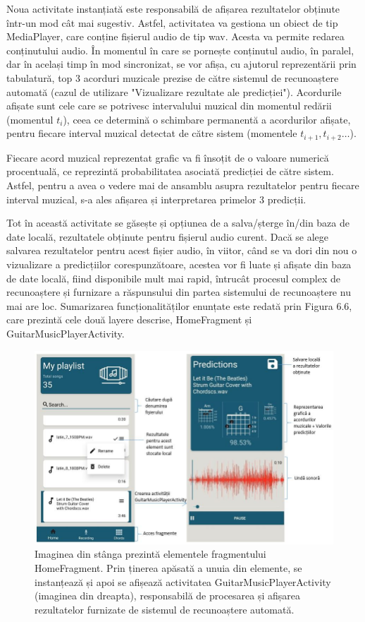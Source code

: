 \documentclass[a4paper,12pt]{report}
\begin{document}
Noua activitate instanțiată este responsabilă de
afișarea rezultatelor obținute într-un mod cât 
mai sugestiv. Astfel, activitatea va gestiona un 
obiect de tip MediaPlayer, care conține fișierul 
audio de tip wav. Acesta va permite redarea 
conținutului audio. În momentul în 
care se pornește conținutul audio, în paralel,
dar în același timp în mod sincronizat, se 
vor afișa, cu ajutorul reprezentării prin tabulatură, 
top 3 acorduri muzicale prezise de către sistemul 
de recunoaștere automată (cazul de utilizare 
"Vizualizare rezultate ale predicției"). 
Acordurile afișate sunt 
cele care se potrivesc intervalului muzical din momentul 
redării (momentul $t_i$), ceea ce determină o schimbare permanentă
a acordurilor afișate, pentru fiecare interval muzical detectat 
de către sistem (momentele $t_{i+1}, t_{i+2}\dots$).  

Fiecare acord muzical reprezentat grafic va fi însoțit 
de o valoare numerică procentuală, ce reprezintă 
probabilitatea asociată predicției de către sistem. 
Astfel, pentru a avea o vedere mai de ansamblu asupra rezultatelor 
pentru fiecare interval muzical, s-a ales afișarea și 
interpretarea primelor 3 predicții.

Tot în această activitate se găsește și opțiunea de a salva/șterge
în/din baza de date locală, rezultatele obținute pentru fișierul audio curent.
Dacă se alege salvarea rezultatelor pentru acest fișier audio, în viitor,
când se va dori din nou o vizualizare a predicțiilor corespunzătoare, 
acestea vor fi luate și afișate din baza de date locală, fiind disponibile 
mult mai rapid, întrucât procesul complex de recunoaștere și furnizare 
a răspunsului din partea sistemului de recunoaștere nu mai are loc. 
Sumarizarea funcționalităților enunțate este redată prin Figura 6.6, 
care prezintă cele două layere descrise, HomeFragment și GuitarMusicPlayerActivity.

\begin{figure}[h!]
    \centering
    \includegraphics[width=15.8cm]{..//resources//images//mobile_1_v2.jpg} 
    \caption{Imaginea din stânga prezintă elementele fragmentului HomeFragment. 
    Prin ținerea apăsată a unuia din elemente, se instanțează și apoi se 
    afișează activitatea GuitarMusicPlayerActivity (imaginea din dreapta), responsabilă 
    de procesarea și afișarea rezultatelor furnizate de sistemul de recunoaștere 
    automată. }
\end{figure}
\end{document}

